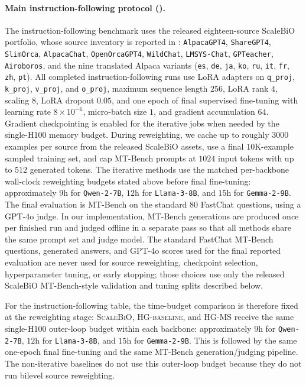 \documentclass{article}
\theoremstyle{normaltheorem}
\begin{document}
\paragraph{Main instruction-following protocol ().}
The instruction-following benchmark uses the released eighteen-source ScaleBiO portfolio, whose source inventory is reported in :
\texttt{AlpacaGPT4}, \texttt{ShareGPT4}, \texttt{SlimOrca}, \texttt{AlpacaChat}, \texttt{OpenOrcaGPT4}, \texttt{WildChat}, \texttt{LMSYS-Chat}, \texttt{GPTeacher}, \texttt{Airoboros}, and the nine translated Alpaca variants (\texttt{es}, \texttt{de}, \texttt{ja}, \texttt{ko}, \texttt{ru}, \texttt{it}, \texttt{fr}, \texttt{zh}, \texttt{pt}). All completed instruction-following runs use LoRA adapters \citep{hu2022lora} on \texttt{q\_proj}, \texttt{k\_proj}, \texttt{v\_proj}, and \texttt{o\_proj}, maximum sequence length \(256\), LoRA rank \(4\), scaling \(8\), LoRA dropout $0.05$, and one epoch of final supervised fine-tuning with learning rate \(8\times 10^{-6}\), micro-batch size $1$, and gradient accumulation $64$. Gradient checkpointing is enabled for the iterative jobs when needed by the single-H100 memory budget. During reweighting, we cache up to roughly $3000$ examples per source from the released ScaleBiO assets, use a final $10$K-example sampled training set, and cap MT-Bench prompts at $1024$ input tokens with up to $512$ generated tokens. The iterative methods use the matched per-backbone wall-clock reweighting budgets stated above before final fine-tuning: approximately $9$h for \texttt{Qwen-2-7B}, $12$h for \texttt{Llama-3-8B}, and $15$h for \texttt{Gemma-2-9B}. The final evaluation is MT-Bench \citep{zheng2023judging} on the standard $80$ FastChat questions, using a GPT-4o judge. In our implementation, MT-Bench generations are produced once per finished run and judged offline in a separate pass so that all methods share the same prompt set and judge model. The standard FastChat MT-Bench questions, generated answers, and GPT-4o scores used for the final reported evaluation are never used for source reweighting, checkpoint selection, hyperparameter tuning, or early stopping; those choices use only the released ScaleBiO MT-Bench-style validation and tuning splits described below.

For the instruction-following table, the time-budget comparison is therefore fixed at the reweighting stage:
\textsc{ScaleBiO}, \textsc{HG-baseline}, and \textsc{HG-MS} receive the same single-H100 outer-loop budget within each
backbone: approximately $9$h for \texttt{Qwen-2-7B}, $12$h for \texttt{Llama-3-8B}, and $15$h for
\texttt{Gemma-2-9B}. This is followed by the same one-epoch final fine-tuning and the same MT-Bench generation/judging pipeline. The
non-iterative baselines do not use this outer-loop budget because they do not run bilevel source reweighting.
\end{document}
